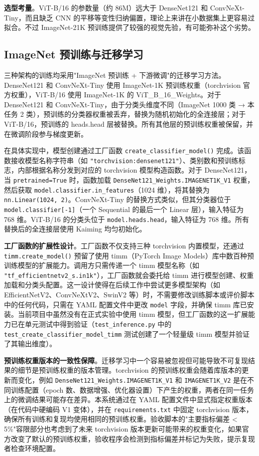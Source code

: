 \documentclass[12pt,a4paper,UTF8,openany]{ctexbook}
\begin{document}
\textbf{选型考量}。ViT-B/16 的参数量（约 86M）远大于 DenseNet121 和 ConvNeXt-Tiny，而且缺乏 CNN 的平移等变性归纳偏置，理论上来讲在小数据集上更容易过拟合。不过 ImageNet-21K 预训练提供了较强的视觉先验，有可能弥补这个劣势。

\subsection{ImageNet 预训练与迁移学习}

三种架构的训练均采用"ImageNet 预训练 + 下游微调"的迁移学习方法。DenseNet121 和 ConvNeXt-Tiny 使用 ImageNet-1K 预训练权重（torchvision 官方权重），ViT-B/16 使用 ImageNet-1K 的 ViT\_B\_16\_Weights。对于 DenseNet121 和 ConvNeXt-Tiny，由于分类头维度不同（ImageNet 1000 类 → 本任务 2 类），预训练的分类器权重被丢弃，替换为随机初始化的全连接层；对于 ViT-B/16，预训练的 heads.head 层被替换。所有其他层的预训练权重被保留，并在微调阶段参与梯度更新。

在具体实现中，模型创建通过工厂函数 \texttt{create\_classifier\_model()} 完成。该函数接收模型名称字符串（如 \texttt{"torchvision:densenet121"}）、类别数和预训练标志，内部根据名称分发到对应的 torchvision 模型构造函数。对于 DenseNet121，当 \texttt{pretrained=True} 时，函数加载 \texttt{DenseNet121\_Weights.IMAGENET1K\_V1} 权重，然后获取 \texttt{model.classifier.in\_features}（1024 维），将其替换为 \texttt{nn.Linear(1024, 2)}。ConvNeXt-Tiny 的替换方式类似，但其分类器位于 \texttt{model.classifier[-1]}（一个 Sequential 的最后一个 Linear 层），输入特征为 768 维。ViT-B/16 的分类头位于 \texttt{model.heads.head}，输入特征为 768 维。所有替换后的全连接层使用 Kaiming 均匀初始化。

\textbf{工厂函数的扩展性设计}。工厂函数不仅支持三种 torchvision 内置模型，还通过 \texttt{timm.create\_model()} 预留了使用 timm（PyTorch Image Models）库中数百种预训练模型的扩展能力。调用方只需传递一个 timm 模型名称（如 \texttt{"tf\_efficientnetv2\_s.in1k"}），工厂函数就会委托给 timm 进行模型创建、权重加载和分类头配置。这一设计使得在后续工作中尝试更多模型架构（如 EfficientNetV2、ConvNeXtV2、SwinV2 等）时，不需要修改训练脚本或评价脚本中的任何代码，只需在 YAML 配置文件中更改 \texttt{model} 字段，并确保 timm 库已安装。当前项目中虽然没有在正式实验中使用 timm 模型，但工厂函数的这一扩展能力已在单元测试中得到验证（\texttt{test\_inference.py} 中的 \texttt{test\_create\_classifier\_model\_timm} 测试创建了一个轻量级 timm 模型并验证了其输出维度）。

\textbf{预训练权重版本的一致性保障}。迁移学习中一个容易被忽视但可能导致不可复现结果的细节是预训练权重的版本管理。torchvision 的预训练权重会随着库版本的更新而变化，例如 \texttt{DenseNet121\_Weights.IMAGENET1K\_V1} 和 \texttt{IMAGENET1K\_V2} 是在不同训练配置（epoch 数、数据增强、优化器设置）下产生的权重，两者在同一任务上的微调结果可能存在差异。本系统通过在 YAML 配置文件中显式指定权重版本（在代码中硬编码 V1 变体），并在 \texttt{requirements.txt} 中固定 torchvision 版本，确保所有训练和复现均使用相同的预训练权重。验收脚本的"主要指标偏差 < 5\%"容限部分也考虑到了未来 torchvision 版本更新可能带来的权重变化，如果官方改变了默认的预训练权重，验收程序会检测到指标偏差并标记为失败，提示复现者检查环境配置。
\end{document}
